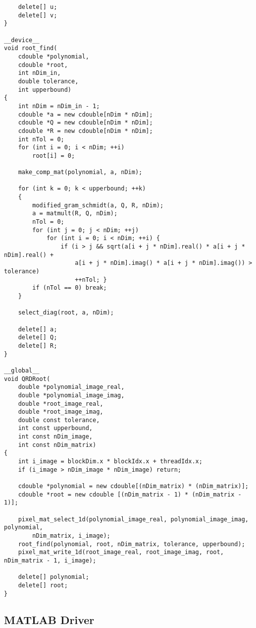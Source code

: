 \documentclass{article}
\begin{document}
\begin{lstlisting}
	delete[] u;
	delete[] v;
}

__device__
void root_find(
	cdouble *polynomial,
	cdouble *root,
	int nDim_in,
	double tolerance,
	int upperbound)
{
	int nDim = nDim_in - 1;
	cdouble *a = new cdouble[nDim * nDim];
	cdouble *Q = new cdouble[nDim * nDim];
	cdouble *R = new cdouble[nDim * nDim];
	int nTol = 0;
	for (int i = 0; i < nDim; ++i)
		root[i] = 0;

	make_comp_mat(polynomial, a, nDim);

	for (int k = 0; k < upperbound; ++k)
	{
		modified_gram_schmidt(a, Q, R, nDim);
		a = matmult(R, Q, nDim);
		nTol = 0;
		for (int j = 0; j < nDim; ++j)
			for (int i = 0; i < nDim; ++i) {
				if (i > j && sqrt(a[i + j * nDim].real() * a[i + j * nDim].real() + 
					a[i + j * nDim].imag() * a[i + j * nDim].imag()) > tolerance) 
					++nTol; }
		if (nTol == 0) break;
	}

	select_diag(root, a, nDim);

	delete[] a;
	delete[] Q;
	delete[] R;
}

__global__
void QRDRoot(
	double *polynomial_image_real,
	double *polynomial_image_imag,
	double *root_image_real,
	double *root_image_imag,
	double const tolerance,
	int const upperbound,
	int const nDim_image,
	int const nDim_matrix)
{
	int i_image = blockDim.x * blockIdx.x + threadIdx.x;
	if (i_image > nDim_image * nDim_image) return;

	cdouble *polynomial = new cdouble[(nDim_matrix) * (nDim_matrix)];
	cdouble *root = new cdouble [(nDim_matrix - 1) * (nDim_matrix - 1)];

	pixel_mat_select_1d(polynomial_image_real, polynomial_image_imag, polynomial,
		nDim_matrix, i_image);
	root_find(polynomial, root, nDim_matrix, tolerance, upperbound);
	pixel_mat_write_1d(root_image_real, root_image_imag, root, nDim_matrix - 1, i_image);

	delete[] polynomial;
	delete[] root;
}
\end{lstlisting}

\subsection{MATLAB Driver}
\end{document}
